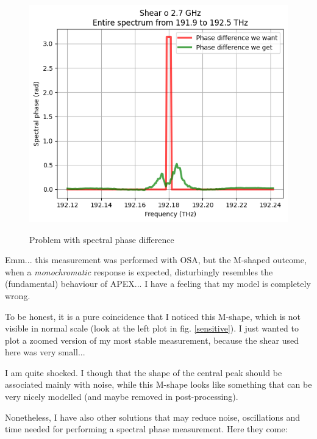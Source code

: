 \documentclass{article}
\begin{document}
\begin{figure}[H]
\caption{Problem with spectral phase difference}
\centering
\includegraphics[scale = 0.7]{spd_problem}
\label{spd_problem}
\end{figure}

Emm... this measurement was performed with OSA, but the M-shaped outcome, when a \emph{monochromatic} response is expected, disturbingly resembles the (fundamental) behaviour of APEX... I have a feeling that my model is completely wrong.

To be honest, it is a pure coincidence that I noticed this M-shape, which is not visible in normal scale (look at the left plot in fig. \ref{sensitive}). I just wanted to plot a zoomed version of my most stable measurement, because the shear used here was very small...

I am quite shocked. I though that the shape of the central peak should be associated mainly with noise, while this M-shape looks like something that can be very nicely modelled (and maybe removed in post-processing).

\pagebreak

Nonetheless, I have also other solutions that may reduce noise, oscillations and time needed for performing a spectral phase measurement. Here they come:
\end{document}
